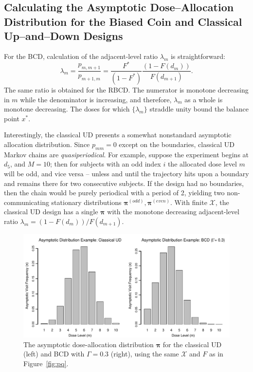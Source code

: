 \subsection{Calculating the Asymptotic Dose--Allocation Distribution for the Biased Coin
and Classical Up--and--Down Designs}

For the BCD, calculation of the adjacent-level ratio $\lambda_m$ is straightforward:
\begin{equation}\label{eq:BCDlambda}
\lambda_m=\frac{p_{m,m+1}}{p_{m+1,m}}=\frac{F^*}{\left(1-F^*\right)}\frac{\left(1-F(d_m)\right)}{F(d_{m+1})}.
\end{equation}
The same ratio is obtained for the RBCD.
 The numerator is monotone decreasing in $m$ while the denominator is increasing, and therefore, $\lambda_m$ as a whole is monotone decreasing. The doses for which $\{\lambda_m\}$ straddle unity bound the balance point $x^*$.

Interestingly, the classical UD presents a somewhat nonstandard asymptotic allocation distribution. Since $p_{mm}=0$ except on the boundaries, classical UD Markov chains are \emph{quasiperiodical}. For example, suppose the experiment begins at $d_5$, and $M=10$; then for subjects with an odd index $i$ the allocated dose level $m$ will be odd, and vice versa -- unless and until the trajectory hits upon a boundary and remains there for two consecutive subjects. If the design had no boundaries, then the chain would be purely periodical with a period of 2, yielding two non-communicating stationary distributions $\boldsymbol{\pi}^{(odd)},\boldsymbol{\pi}^{(even)}$. With finite $\mathcal{X}$, the classical UD design has a single $\boldsymbol{\pi}$ with the monotone decreasing adjacent-level ratio $\lambda_m=\left(1-F(d_m)\right)/F(d_{m+1})$.

\begin{figure}
\begin{center}
\includegraphics[scale=0.55]{pifig}
\caption{The asymptotic dose-allocation distribution $\boldsymbol{\pi}$ for the classical UD (left) and BCD with $\Gamma=0.3$ (right), using the same $\mathcal{X}$ and $F$ as in Figure~\ref{fig:pq}.}\label{fig:pi}
\end{center}
\end{figure}


